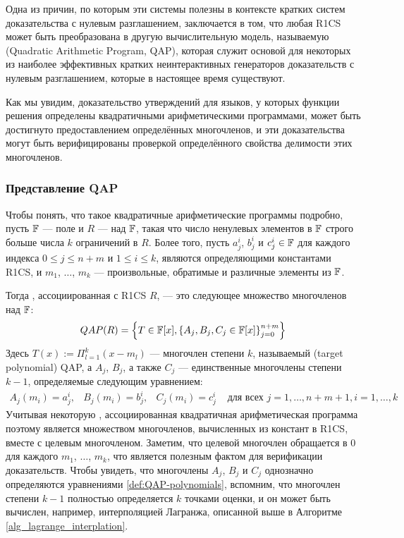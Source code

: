 Одна из причин, по которым эти системы полезны в контексте кратких систем доказательства с нулевым разглашением, заключается в том, что любая R1CS может быть преобразована в другую вычислительную модель, называемую  (Quadratic Arithmetic Program, QAP), которая служит основой для некоторых из наиболее эффективных кратких неинтерактивных генераторов доказательств с нулевым разглашением, которые в настоящее время существуют.

Как мы увидим, доказательство утверждений для языков, у которых функции решения определены квадратичными арифметическими программами, может быть достигнуто предоставлением определённых многочленов, и эти доказательства могут быть верифицированы проверкой определённого свойства делимости этих многочленов.
 
\subsubsection{Представление QAP} Чтобы понять, что такое квадратичные арифметические программы подробно, пусть $\mathbb{F}$ — поле и $R$ —  над $\mathbb{F}$, такая что число ненулевых элементов в $\mathbb{F}$ строго больше числа $k$ ограничений в $R$. Более того, пусть $a_j^i$, $b_j^i$ и $c_j^i\in\mathbb{F}$ для каждого индекса $0\leq j \leq n+m$ и $1\leq i \leq k$, являются определяющими константами R1CS, и $m_1$, $\ldots$, $m_k$ — произвольные, обратимые и различные элементы из $\mathbb{F}$.
  
Тогда , ассоциированная с R1CS $R$, — это следующее множество многочленов над $\mathbb{F}$:
\begin{equation}
\label{def:QAP-target-poly}
QAP(R) = \left\{T\in \mathbb{F}[x],\left\{A_j,B_j,C_j\in \mathbb{F}[x]\right\}_{j=0}^{n+m}\right\}
\end{equation}
Здесь $T(x) := \Pi_{l=1}^k (x- m_l)$ — многочлен степени $k$, называемый  (target polynomial) QAP, а $A_j$, $B_j$, а также $C_j$ — единственные многочлены степени $k-1$, определяемые следующим уравнением:
\begin{equation}
\label{def:QAP-polynomials}
\begin{array}{lllr}
A_j(m_i)=a_j^i, & B_j(m_i)=b_j^i, & C_j(m_i)=c_j^i & \text{ для всех } j= 1, \ldots , n+m+1, i=1,\ldots,k 
\end{array}
\end{equation}
Учитывая некоторую , ассоциированная квадратичная арифметическая программа поэтому является множеством многочленов, вычисленных из констант в R1CS, вместе с целевым многочленом. Заметим, что целевой многочлен обращается в $0$ для каждого $m_1$, $\ldots$, $m_k$, что является полезным фактом для верификации доказательств. Чтобы увидеть, что многочлены $A_j$, $B_j$ и $C_j$ однозначно определяются уравнениями \ref{def:QAP-polynomials}, вспомним, что многочлен степени $k-1$ полностью определяется $k$ точками оценки, и он может быть вычислен, например, интерполяцией Лагранжа, описанной выше в Алгоритме \ref{alg_lagrange_interplation}.

